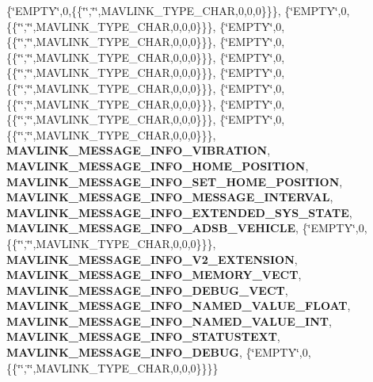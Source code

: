 \begin{DoxyCompactItemize}
\{\char`\"{}E\+M\+P\+TY\char`\"{},0,\{\{\char`\"{}\char`\"{},\char`\"{}\char`\"{},M\+A\+V\+L\+I\+N\+K\+\_\+\+T\+Y\+P\+E\+\_\+\+C\+H\+AR,0,0,0\}\}\}, \{\char`\"{}E\+M\+P\+TY\char`\"{},0,\{\{\char`\"{}\char`\"{},\char`\"{}\char`\"{},M\+A\+V\+L\+I\+N\+K\+\_\+\+T\+Y\+P\+E\+\_\+\+C\+H\+AR,0,0,0\}\}\}, \{\char`\"{}E\+M\+P\+TY\char`\"{},0,\{\{\char`\"{}\char`\"{},\char`\"{}\char`\"{},M\+A\+V\+L\+I\+N\+K\+\_\+\+T\+Y\+P\+E\+\_\+\+C\+H\+AR,0,0,0\}\}\}, \{\char`\"{}E\+M\+P\+TY\char`\"{},0,\{\{\char`\"{}\char`\"{},\char`\"{}\char`\"{},M\+A\+V\+L\+I\+N\+K\+\_\+\+T\+Y\+P\+E\+\_\+\+C\+H\+AR,0,0,0\}\}\}, \{\char`\"{}E\+M\+P\+TY\char`\"{},0,\{\{\char`\"{}\char`\"{},\char`\"{}\char`\"{},M\+A\+V\+L\+I\+N\+K\+\_\+\+T\+Y\+P\+E\+\_\+\+C\+H\+AR,0,0,0\}\}\}, \{\char`\"{}E\+M\+P\+TY\char`\"{},0,\{\{\char`\"{}\char`\"{},\char`\"{}\char`\"{},M\+A\+V\+L\+I\+N\+K\+\_\+\+T\+Y\+P\+E\+\_\+\+C\+H\+AR,0,0,0\}\}\}, \{\char`\"{}E\+M\+P\+TY\char`\"{},0,\{\{\char`\"{}\char`\"{},\char`\"{}\char`\"{},M\+A\+V\+L\+I\+N\+K\+\_\+\+T\+Y\+P\+E\+\_\+\+C\+H\+AR,0,0,0\}\}\}, \{\char`\"{}E\+M\+P\+TY\char`\"{},0,\{\{\char`\"{}\char`\"{},\char`\"{}\char`\"{},M\+A\+V\+L\+I\+N\+K\+\_\+\+T\+Y\+P\+E\+\_\+\+C\+H\+AR,0,0,0\}\}\}, \{\char`\"{}E\+M\+P\+TY\char`\"{},0,\{\{\char`\"{}\char`\"{},\char`\"{}\char`\"{},M\+A\+V\+L\+I\+N\+K\+\_\+\+T\+Y\+P\+E\+\_\+\+C\+H\+AR,0,0,0\}\}\}, \textbf{ M\+A\+V\+L\+I\+N\+K\+\_\+\+M\+E\+S\+S\+A\+G\+E\+\_\+\+I\+N\+F\+O\+\_\+\+V\+I\+B\+R\+A\+T\+I\+ON}, \textbf{ M\+A\+V\+L\+I\+N\+K\+\_\+\+M\+E\+S\+S\+A\+G\+E\+\_\+\+I\+N\+F\+O\+\_\+\+H\+O\+M\+E\+\_\+\+P\+O\+S\+I\+T\+I\+ON}, \textbf{ M\+A\+V\+L\+I\+N\+K\+\_\+\+M\+E\+S\+S\+A\+G\+E\+\_\+\+I\+N\+F\+O\+\_\+\+S\+E\+T\+\_\+\+H\+O\+M\+E\+\_\+\+P\+O\+S\+I\+T\+I\+ON}, \textbf{ M\+A\+V\+L\+I\+N\+K\+\_\+\+M\+E\+S\+S\+A\+G\+E\+\_\+\+I\+N\+F\+O\+\_\+\+M\+E\+S\+S\+A\+G\+E\+\_\+\+I\+N\+T\+E\+R\+V\+AL}, \textbf{ M\+A\+V\+L\+I\+N\+K\+\_\+\+M\+E\+S\+S\+A\+G\+E\+\_\+\+I\+N\+F\+O\+\_\+\+E\+X\+T\+E\+N\+D\+E\+D\+\_\+\+S\+Y\+S\+\_\+\+S\+T\+A\+TE}, \textbf{ M\+A\+V\+L\+I\+N\+K\+\_\+\+M\+E\+S\+S\+A\+G\+E\+\_\+\+I\+N\+F\+O\+\_\+\+A\+D\+S\+B\+\_\+\+V\+E\+H\+I\+C\+LE}, \{\char`\"{}E\+M\+P\+TY\char`\"{},0,\{\{\char`\"{}\char`\"{},\char`\"{}\char`\"{},M\+A\+V\+L\+I\+N\+K\+\_\+\+T\+Y\+P\+E\+\_\+\+C\+H\+AR,0,0,0\}\}\}, \textbf{ M\+A\+V\+L\+I\+N\+K\+\_\+\+M\+E\+S\+S\+A\+G\+E\+\_\+\+I\+N\+F\+O\+\_\+\+V2\+\_\+\+E\+X\+T\+E\+N\+S\+I\+ON}, \textbf{ M\+A\+V\+L\+I\+N\+K\+\_\+\+M\+E\+S\+S\+A\+G\+E\+\_\+\+I\+N\+F\+O\+\_\+\+M\+E\+M\+O\+R\+Y\+\_\+\+V\+E\+CT}, \textbf{ M\+A\+V\+L\+I\+N\+K\+\_\+\+M\+E\+S\+S\+A\+G\+E\+\_\+\+I\+N\+F\+O\+\_\+\+D\+E\+B\+U\+G\+\_\+\+V\+E\+CT}, \textbf{ M\+A\+V\+L\+I\+N\+K\+\_\+\+M\+E\+S\+S\+A\+G\+E\+\_\+\+I\+N\+F\+O\+\_\+\+N\+A\+M\+E\+D\+\_\+\+V\+A\+L\+U\+E\+\_\+\+F\+L\+O\+AT}, \textbf{ M\+A\+V\+L\+I\+N\+K\+\_\+\+M\+E\+S\+S\+A\+G\+E\+\_\+\+I\+N\+F\+O\+\_\+\+N\+A\+M\+E\+D\+\_\+\+V\+A\+L\+U\+E\+\_\+\+I\+NT}, \textbf{ M\+A\+V\+L\+I\+N\+K\+\_\+\+M\+E\+S\+S\+A\+G\+E\+\_\+\+I\+N\+F\+O\+\_\+\+S\+T\+A\+T\+U\+S\+T\+E\+XT}, \textbf{ M\+A\+V\+L\+I\+N\+K\+\_\+\+M\+E\+S\+S\+A\+G\+E\+\_\+\+I\+N\+F\+O\+\_\+\+D\+E\+B\+UG}, \{\char`\"{}E\+M\+P\+TY\char`\"{},0,\{\{\char`\"{}\char`\"{},\char`\"{}\char`\"{},M\+A\+V\+L\+I\+N\+K\+\_\+\+T\+Y\+P\+E\+\_\+\+C\+H\+AR,0,0,0\}\}\}\}

\end{DoxyCompactItemize}
